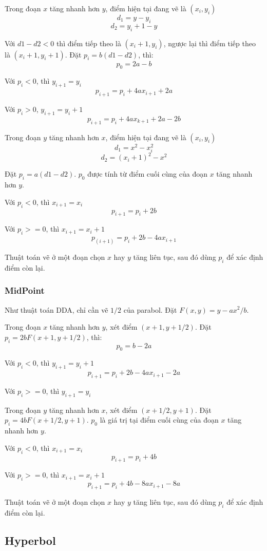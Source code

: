 \documentclass[12pt]{article}
\begin{document}
Trong đoạn \(x\) tăng nhanh hơn \(y\), điểm hiện tại đang vẽ là \((x_i, y_i)\)
\[d_1 = y - y_i\]
\[d_2 = y_i + 1 - y\]

Với \(d1 - d2 < 0\) thì điểm tiếp theo là \((x_i + 1, y_i)\),
ngược lại thì điểm tiếp theo là \((x_i + 1, y_i + 1)\).
Đặt \(p_i = b (d1 - d2)\), thì:
\[p_0 = 2a - b\]

Với \(p_i < 0\), thì \(y_{i+1} = y_i\)
\[p_{i+1} = p_i + 4a x_{i+1} + 2a\]

Với \(p_i > 0\), \(y_{i+1} = y_i + 1\)
\[p_{i+1} = p_i + 4a x_{k+1} + 2a - 2b\]

Trong đoạn \(y\) tăng nhanh hơn \(x\), điểm hiện tại đang vẽ là \((x_i, y_i)\)
\[d_1 = x^2 - x_i^2\]
\[d_2 = (x_i + 1)^2 - x^2\]

Đặt \(p_i = a (d1 - d2)\). \(p_0\) được tính từ điểm cuối cùng của
đoạn \(x\) tăng nhanh hơn \(y\).

Với \(p_i < 0\), thì \(x_{i+1} = x_i\)
\[p_{i+1} = p_i + 2b\]

Với \(p_i >= 0\), thì \(x_{i+1} = x_i + 1\)
\[p_(i+1) = p_i + 2b - 4a x_{i+1}\]

Thuật toán vẽ ở một đoạn chọn \(x\) hay \(y\) tăng liên tục,
sau đó dùng \(p_i\) để xác định điểm còn lại.

\subsubsection{MidPoint}
Như thuật toán DDA, chỉ cần vẽ \(1/2\) của parabol.
Đặt \(F(x, y) = y - ax^2/b\).

Trong đoạn \(x\) tăng nhanh hơn \(y\), xét điểm \((x + 1, y + 1/2)\).
Đặt \(p_i = 2b F(x + 1, y + 1/2)\), thì:
\[p_0 = b - 2a\]

Với \(p_i < 0\), thì \(y_{i+1} = y_i + 1\)
\[p_{i+1} = p_i + 2b - 4a x_{i+1} - 2a\]

Với \(p_i >= 0\), thì \(y_{i+1} = y_i\)

Trong đoạn \(y\) tăng nhanh hơn \(x\), xét điểm \((x + 1/2, y + 1)\).
Đặt \(p_i = 4b F(x + 1/2, y + 1)\).
\(p_0\) là giá trị tại điểm cuối cùng của đoạn \(x\) tăng nhanh hơn \(y\).

Với \(p_i < 0\), thì \(x_{i+1} = x_i\)
\[p_{i+1} = p_i + 4b\]

Với \(p_i >= 0\), thì \(x_{i+1} = x_i + 1\)
\[p_{i+1} = p_i + 4b - 8a x_{i+1} - 8a\]

Thuật toán vẽ ở một đoạn chọn \(x\) hay \(y\) tăng liên tục,
sau đó dùng \(p_i\) để xác định điểm còn lại.

\subsection{Hyperbol}
\end{document}
